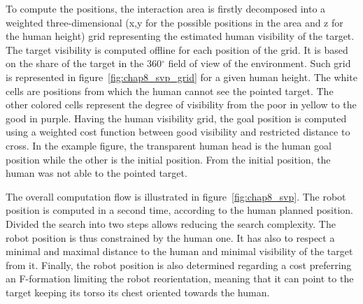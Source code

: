 To compute the positions, the interaction area is firstly decomposed into a weighted three-dimensional (x,y for the possible positions in the area and z for the human height) grid representing the estimated human visibility of the target. The target visibility is computed offline for each position of the grid. It is based on the share of the target in the 360${^\circ}$ field of view of the environment. Such grid is represented in figure~\ref{fig:chap8_svp_grid} for a given human height. The white cells are positions from which the human cannot see the pointed target. The other colored cells represent the degree of visibility from the poor in yellow to the good in purple. Having the human visibility grid, the goal position is computed using a weighted cost function between good visibility and restricted distance to cross. In the example figure, the transparent human head is the human goal position while the other is the initial position. From the initial position, the human was not able to the pointed target.

The overall computation flow is illustrated in figure~\ref{fig:chap8_svp}. The robot position is computed in a second time, according to the human planned position. Divided the search into two steps allows reducing the search complexity. The robot position is thus constrained by the human one. It has also to respect a minimal and maximal distance to the human and minimal visibility of the target from it. Finally, the robot position is also determined regarding a cost preferring an F-formation limiting the robot reorientation, meaning that it can point to the target keeping its torso its chest oriented towards the human.

